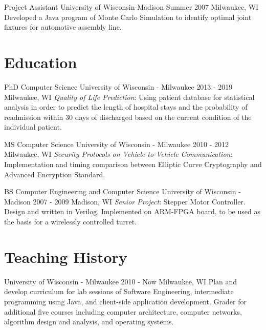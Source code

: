 \documentclass[]{clean-resume}
\begin{document}
\entry
	{Project Assistant}
	{University of Wisconsin-Madison}
	{Summer 2007}
	{Milwaukee, WI}
	{
		Developed a Java program of Monte Carlo Simulation to identify optimal joint fixtures for automotive assembly line.		
	}

\section{Education}

\entry
	{PhD Computer Science}
	{University of Wisconsin - Milwaukee}
	{2013 - 2019}
	{Milwaukee, WI}
	{
		\emph{Quality of Life Prediction}: Using patient database for statistical analysis in order to predict the length of hospital stays and the probability of readmission within 30 days of discharged based on the current condition of the individual patient.
	}

\entry
	{MS Computer Science}
	{University of Wisconsin - Milwaukee}
	{2010 - 2012}
	{Milwaukee, WI}
	{
		\emph{Security Protocols on Vehicle-to-Vehicle Communication}: Implementation and timing comparison between Elliptic Curve Cryptography and Advanced Encryption Standard.
	}

\entry
	{BS Computer Engineering and Computer Science}
	{University of Wisconsin - Madison}
	{2007 - 2009}
	{Madison, WI}
	{
		\emph{Senior Project}: Stepper Motor Controller. Design and written in Verilog. Implemented on 
		ARM-FPGA board, to be used as the basis for a wirelessly controlled turret.
	}

\section{Teaching History}

\entry
	{University of Wisconsin - Milwaukee}
	{}
	{2010 - Now}
	{Milwaukee, WI}
	{
		Plan and develop curriculum for lab sessions of Software Engineering, intermediate programming using Java, and client-side application development. Grader for additional five courses including computer architecture, computer networks, algorithm design and analysis, and operating systems.
	}
\end{document}
